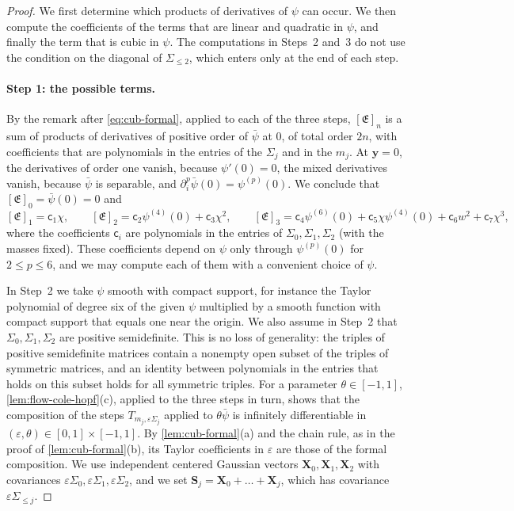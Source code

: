 \begin{proof}
We first determine which products of derivatives of $\psi$ can occur. We then
compute the coefficients of the terms that are linear and quadratic in $\psi$,
and finally the term that is cubic in $\psi$. The computations in Steps~2
and~3 do not use the condition on the diagonal of $\Sigma_{\le2}$, which enters
only at the end of each step.

\paragraph{Step 1: the possible terms.} By the remark after
\eqref{eq:cub-formal}, applied to each of the three steps, $[\mathfrak E]_n$ is
a sum of products of derivatives of positive order of $\bar\psi$ at $0$, of total
order $2n$, with coefficients that are polynomials in the entries of the
$\Sigma_j$ and in the $m_j$. At $\mathbf y=0$, the derivatives of order one
vanish, because $\psi'(0)=0$, the mixed derivatives vanish, because $\bar\psi$ is
separable, and $\partial_i^p\bar\psi(0)=\psi^{(p)}(0)$. We conclude that
$[\mathfrak E]_0=\bar\psi(0)=0$ and
\[
 [\mathfrak E]_1=\mathsf c_1\chi,\qquad [\mathfrak E]_2=\mathsf c_2\psi^{(4)}(0)+\mathsf c_3\chi^2,\qquad
 [\mathfrak E]_3=\mathsf c_4\psi^{(6)}(0)+\mathsf c_5\chi\psi^{(4)}(0)+\mathsf c_6w^2+\mathsf c_7\chi^3,
\]
where the coefficients $\mathsf c_i$ are polynomials in the entries of
$\Sigma_0,\Sigma_1,\Sigma_2$ (with the masses fixed). These
coefficients depend on $\psi$ only through $\psi^{(p)}(0)$ for $2\le p\le6$, and
we may compute each of them with a convenient choice of $\psi$.

In Step~2 we take $\psi$ smooth with compact support, for instance the Taylor
polynomial of degree six of the given $\psi$ multiplied by a smooth function
with compact support that equals one near the origin. We also assume in Step~2
that $\Sigma_0,\Sigma_1,\Sigma_2$ are positive semidefinite. This is no loss of
generality: the triples of positive semidefinite matrices contain a nonempty
open subset of the triples of symmetric matrices, and an identity between
polynomials in the entries that holds on this subset holds for all symmetric
triples. For a parameter $\theta\in[-1,1]$, \cref{lem:flow-cole-hopf}(c),
applied to the three steps in turn, shows that the composition of the steps
$T_{m_j,\varepsilon\Sigma_j}$ applied to $\theta\bar\psi$ is infinitely
differentiable in $(\varepsilon,\theta)\in[0,1]\times[-1,1]$. By
\cref{lem:cub-formal}(a) and the chain rule, as in the proof of
\cref{lem:cub-formal}(b), its Taylor coefficients in $\varepsilon$ are those of
the formal composition. We use independent centered Gaussian vectors
$\mathbf X_0,\mathbf X_1,\mathbf X_2$ with covariances
$\varepsilon\Sigma_0,\varepsilon\Sigma_1,\varepsilon\Sigma_2$, and we set
$\mathbf S_j=\mathbf X_0+\dots+\mathbf X_j$, which has covariance
$\varepsilon\Sigma_{\le j}$.


\end{proof}
